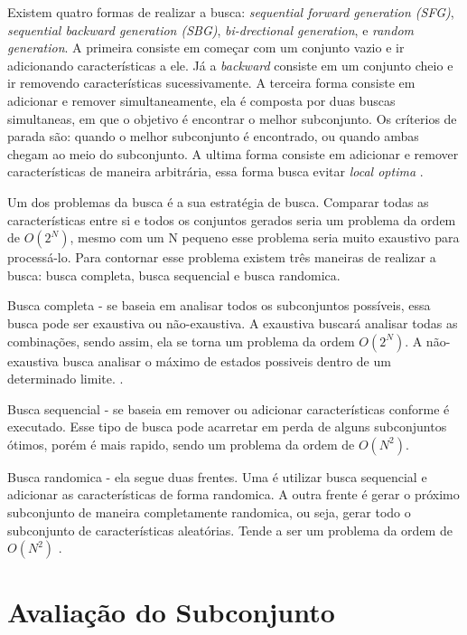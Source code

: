 Existem quatro formas de realizar a busca: \textit{sequential forward generation (SFG)}, \textit{ sequential backward generation (SBG)}, \textit{bi-drectional generation}, e \textit{random generation}. A primeira consiste em começar com um conjunto vazio e ir adicionando características a ele. Já a \textit{backward} consiste em um conjunto cheio e ir removendo características sucessivamente. A terceira forma consiste em adicionar e remover simultaneamente, ela é composta por duas buscas simultaneas, em que o objetivo é encontrar o melhor subconjunto. Os críterios de parada são: quando o melhor subconjunto é encontrado, ou quando ambas chegam ao meio do subconjunto. A ultima forma consiste em adicionar e remover características de maneira arbitrária, essa forma busca evitar \textit{local optima} \cite{liu_2005}. 

Um dos problemas da busca é a sua estratégia de busca. Comparar todas as características entre si e todos os conjuntos gerados seria um problema da ordem de $O(2^N)$, mesmo com um N pequeno esse problema seria muito exaustivo para processá-lo. Para contornar esse problema existem três maneiras de realizar a busca: busca completa, busca sequencial e busca randomica.

Busca completa - se baseia em analisar todos os subconjuntos possíveis, essa busca pode ser exaustiva ou não-exaustiva. A exaustiva buscará analisar todas as combinações, sendo assim, ela se torna um problema da ordem $O(2^N)$. A não-exaustiva busca analisar o máximo de estados possiveis dentro de um determinado limite. \cite{liu_2005}. 

Busca sequencial - se baseia em remover ou adicionar características conforme é executado. Esse tipo de busca pode acarretar em perda de alguns subconjuntos ótimos, porém é mais rapido, sendo um problema da ordem de $O(N^2)$. \cite{dash_1997}

Busca randomica - ela segue duas frentes. Uma é utilizar busca sequencial e adicionar as características de forma randomica. A outra frente é gerar o próximo subconjunto de maneira completamente randomica, ou seja, gerar todo o subconjunto de características aleatórias. Tende a ser um problema da ordem de $O(N^2)$ \cite{liu_2005}.

\section{Avaliação do Subconjunto}

